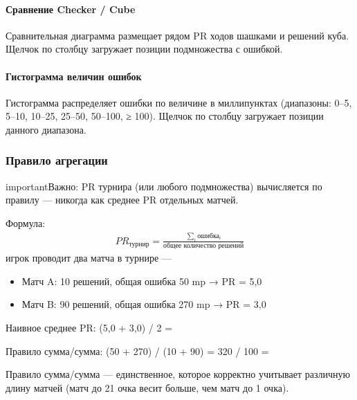 \documentclass[letterpaper,10pt,russian]{sphinxmanual}
\begin{document}
\paragraph{Сравнение Checker / Cube}
\label{\detokenize{manuel:repartition-checker-cube}}
\sphinxAtStartPar
Сравнительная диаграмма размещает рядом PR ходов шашками и решений куба. Щелчок по столбцу загружает позиции подмножества с ошибкой.


\paragraph{Гистограмма величин ошибок}
\label{\detokenize{manuel:histogramme-des-magnitudes-d-erreur}}
\sphinxAtStartPar
Гистограмма распределяет ошибки по величине в миллипунктах (диапазоны: 0–5, 5–10, 10–25, 25–50, 50–100, ≥ 100). Щелчок по столбцу загружает позиции данного диапазона.


\subsubsection{Правило агрегации}
\label{\detokenize{manuel:regle-d-agregation}}
\begin{sphinxadmonition}{important}{Важно:}
\sphinxAtStartPar
PR турнира (или любого подмножества) вычисляется по правилу  — никогда как среднее PR отдельных матчей.

\sphinxAtStartPar
Формула:
\begin{equation*}
\begin{split}PR_{\text{турнир}} = \frac{\sum_{i} \text{ошибка}_i}{\text{общее количество решений}}\end{split}
\end{equation*}
\sphinxAtStartPar
{} игрок проводит два матча в турнире —
\begin{itemize}
\item {} 
\sphinxAtStartPar
Матч A: 10 решений, общая ошибка 50 mp → PR = 5,0

\item {} 
\sphinxAtStartPar
Матч B: 90 решений, общая ошибка 270 mp → PR = 3,0

\end{itemize}

\sphinxAtStartPar
Наивное среднее PR: (5,0 + 3,0) / 2 =  

\sphinxAtStartPar
Правило сумма/сумма: (50 + 270) / (10 + 90) = 320 / 100 =  

\sphinxAtStartPar
Правило сумма/сумма — единственное, которое корректно учитывает различную длину матчей (матч до 21 очка весит больше, чем матч до 1 очка).
\end{sphinxadmonition}
\end{document}
